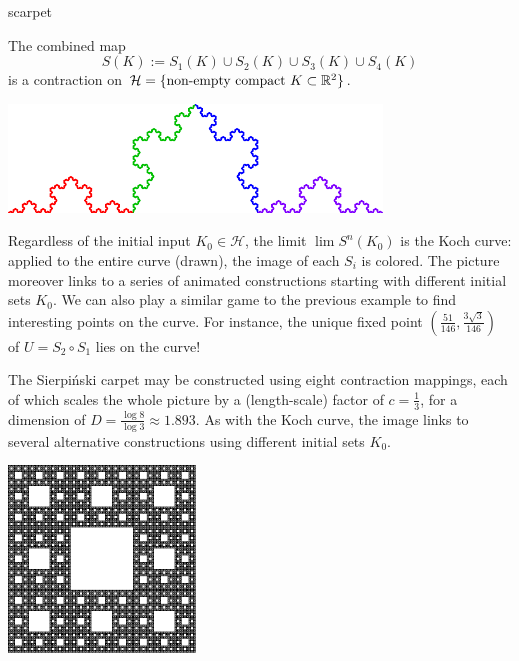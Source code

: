 \begin{examples}{}{scarpet}
\begin{enumerate}
		\begin{minipage}[t]{0.6\linewidth}\vspace{0pt}
			The combined map
			\[
				S(K):=S_1(K)\cup S_2(K)\cup S_3(K)\cup S_4(K)
			\]
			is a contraction on $\mathcal H=\{\text{non-empty compact }K\subset\mathbb{R}^2\}$. 
		\end{minipage}
		\hfill
		\begin{minipage}[t]{0.39\linewidth}\vspace{0pt}
			\flushright \href{http://www.math.uci.edu/~ndonalds/math161/koch-anim2.html}{\includegraphics[scale=0.95]{koch3}}
		\end{minipage}\par
		Regardless of the initial input $K_0\in\mathcal H$, the limit $\lim S^n(K_0)$ is the Koch curve:	applied to the entire curve (drawn), the image of each $S_i$ is colored. The picture moreover links to a series of animated constructions starting with different initial sets $K_0$.\smallbreak
		We can also play a similar game to the previous example to find interesting points on the curve. For instance, the unique fixed point $(\frac{51}{146},\frac{3\sqrt 3}{146})$ of $U=S_2\circ S_1$ lies on the curve!
		
		\begin{minipage}[t]{0.72\linewidth}\vspace{0pt}
			\item\label{ex:scarpet2} The Sierpiński carpet may be constructed using eight contraction mappings, each of which scales the whole picture by a (length-scale) factor of $c=\frac 13$, for a dimension of $D=\frac{\log 8}{\log 3}\approx 1.893$.\smallbreak
			As with the Koch curve, the image links to several alternative constructions using different initial sets $K_0$.
		\end{minipage}
		\hfill
		\begin{minipage}[t]{0.27\linewidth}\vspace{0pt}
			\flushright \href{http://www.math.uci.edu/~ndonalds/math161/sier-anim.html}{\includegraphics[scale=1]{sieranim2}}
		\end{minipage}\smallbreak
		

\end{enumerate}
\end{examples}
